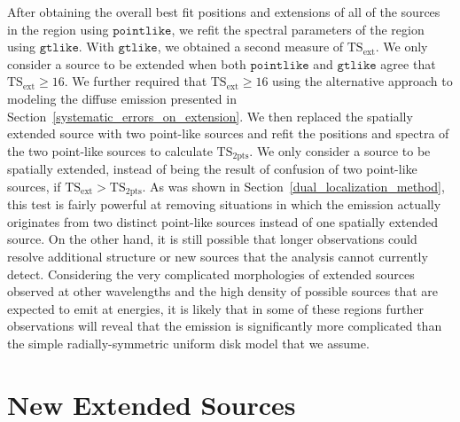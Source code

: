 \documentclass[12pt,preprint]{aastex}
\newcommand{\gev}{\text{GeV}\xspace}
\newcommand{\tsext}{{\ensuremath{\text{TS}_{\text{ext}}}}\xspace}
\newcommand{\tsinc}{\ensuremath{\text{TS}_{\text{2pts}}}\xspace}
\newcommand{\gtlike}{\ensuremath{\mathtt{gtlike}}\xspace}
\newcommand{\pointlike}{\ensuremath{\mathtt{pointlike}}\xspace}
\begin{document}
After obtaining the overall best fit positions and extensions of all
of the sources in the region using \pointlike, we refit the spectral
parameters of the region using \gtlike.  With \gtlike, we obtained a
second measure of \tsext.  We only consider a source to be extended when
both \pointlike and \gtlike agree that $\tsext\ge16$. 
We further required that $\tsext\ge16$ using the 
alternative approach to modeling the diffuse emission
presented in Section~\ref{systematic_errors_on_extension}.
We then replaced the spatially extended source with two point-like
sources and refit the positions and spectra of the
two point-like sources to calculate \tsinc.
We only consider a source to be spatially extended, instead of being
the result of confusion of two point-like sources, if $\tsext>\tsinc$.
As was shown in Section~\ref{dual_localization_method}, this test is
fairly powerful at removing situations in which the emission actually
originates from two distinct point-like sources instead of one spatially
extended source.  On the other hand, it is still possible that longer
observations could resolve additional structure or new sources 
that the analysis cannot currently detect. 
Considering the very complicated morphologies
of extended sources observed at other wavelengths and the high density
of possible sources that are expected to emit at \gev energies, it is
likely that in some of these regions further observations will reveal
that the emission is significantly more complicated than the simple
radially-symmetric uniform disk model that we assume.


\section{New Extended Sources}
\label{new_ext_srcs_section}


\end{document}
